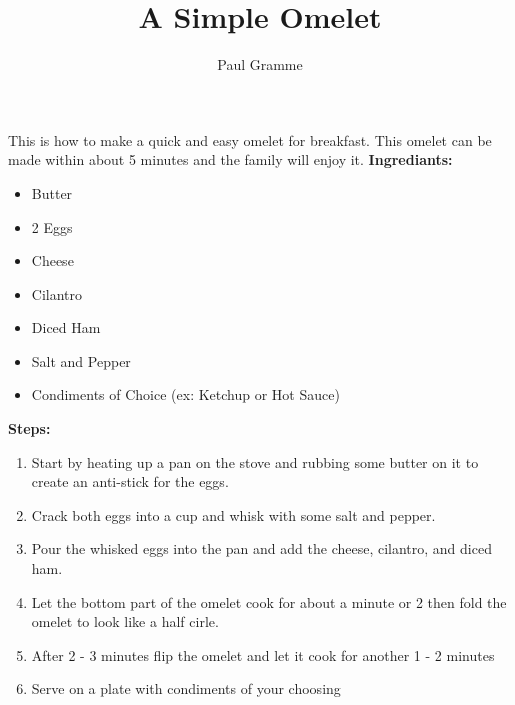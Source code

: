 \documentclass[12pt]{article}
\author{Paul Gramme}
\begin{document}
%
%
\title{A Simple Omelet}
\maketitle{}
\hfill This is how to make a quick and easy omelet for breakfast. This omelet can be made within about 5 minutes and the family will enjoy it. \bigskip
%
%
\newline
\noindent \textbf{Ingrediants:}
\begin{itemize}
\item Butter
\item 2 Eggs
\item Cheese
\item Cilantro
\item Diced Ham
\item Salt and Pepper
\item Condiments of Choice (ex: Ketchup or Hot Sauce)
\end{itemize}
%
%
\bigskip
\noindent \textbf{Steps:}
\begin{enumerate}
\item Start by heating up a pan on the stove and rubbing some butter on it to create an anti-stick for the eggs.
\item Crack both eggs into a cup and whisk with some salt and pepper.
\item Pour the whisked eggs into the pan and add the cheese, cilantro, and diced ham.
\item Let the bottom part of the omelet cook for about a minute or 2 then fold the omelet to look like a half cirle.
\item After 2 - 3 minutes flip the omelet and let it cook for another 1 - 2 minutes
\item Serve on a plate with condiments of your choosing
\end{enumerate}
\end{document}
